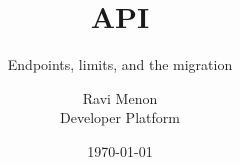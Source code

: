 \documentclass[aspectratio=169,11pt]{beamer}
\title{API}
\subtitle{Endpoints, limits, and the migration}
\author{Ravi Menon \\ \small Developer Platform}
\date{\today}
\begin{document}
\titleslide





\end{document}
